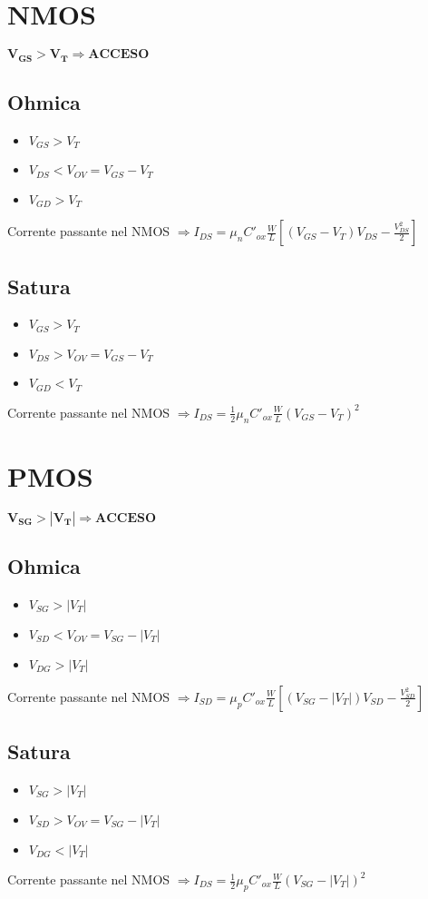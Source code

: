 \documentclass[12pt, letterpaper]{article}
\begin{document}
\section{NMOS}
$\mathbf{V_{GS} > V_T \Rightarrow ACCESO}$

\subsection{Ohmica}
\begin{itemize}
    \item $V_{GS} > V_T$
    \item $V_{DS} < V_{OV} = V_{GS} - V_T$
    \item $V_{GD} > V_T$
\end{itemize}

Corrente passante nel NMOS $\Rightarrow I_{DS} = \mu_nC'_{ox}\frac{W}{L}\left[\left(V_{GS}-V_T\right)V_{DS}-\frac{V_{DS}^2}{2}\right]$

\subsection{Satura}
\begin{itemize}
    \item $V_{GS} > V_T$
    \item $V_{DS} > V_{OV} = V_{GS} - V_T$
    \item $V_{GD} < V_T$
\end{itemize}

Corrente passante nel NMOS $\Rightarrow I_{DS}=\frac{1}{2}\mu_nC'_{ox}\frac{W}{L}\left(V_{GS}-V_T\right)^2$

\newpage
\section{PMOS}
$\mathbf{V_{SG} > \left|V_T\right| \Rightarrow ACCESO}$

\subsection{Ohmica}
\begin{itemize}
    \item $V_{SG} > |V_T|$
    \item $V_{SD} < V_{OV} = V_{SG} - |V_T|$
    \item $V_{DG} > |V_T|$
\end{itemize}

Corrente passante nel NMOS $\Rightarrow I_{SD} = \mu_pC'_{ox}\frac{W}{L}\left[\left(V_{SG}-|V_T|\right)V_{SD}-\frac{V_{SD}^2}{2}\right]$

\subsection{Satura}
\begin{itemize}
    \item $V_{SG} > |V_T|$
    \item $V_{SD} > V_{OV} = V_{SG} - |V_T|$
    \item $V_{DG} < |V_T|$
\end{itemize}

Corrente passante nel NMOS $\Rightarrow I_{DS}=\frac{1}{2}\mu_pC'_{ox}\frac{W}{L}\left(V_{SG}-|V_T|\right)^2$
\end{document}
